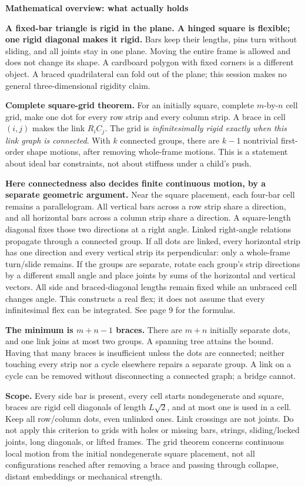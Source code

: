 \documentclass[letterpaper,11pt]{article}
\newcommand{\titleline}[1]{\par{\large\bfseries #1}\par}
\begin{document}
\titleline{Mathematical overview: what actually holds}
\textbf{A fixed-bar triangle is rigid in the plane. A hinged square is flexible; one rigid diagonal makes it rigid.} Bars keep their lengths, pins turn without sliding, and all joints stay in one plane. Moving the entire frame is allowed and does not change its shape. A cardboard polygon with fixed corners is a different object. A braced quadrilateral can fold out of the plane; this session makes no general three-dimensional rigidity claim.

\textbf{Complete square-grid theorem.} For an initially square, complete $m$-by-$n$ cell grid, make one dot for every row strip and every column strip. A brace in cell $(i,j)$ makes the link $R_iC_j$. The grid is \emph{infinitesimally rigid exactly when this link graph is connected}. With $k$ connected groups, there are $k-1$ nontrivial first-order shape motions, after removing whole-frame motions. This is a statement about ideal bar constraints, not about stiffness under a child's push.

\textbf{Here connectedness also decides finite continuous motion, by a separate geometric argument.} Near the square placement, each four-bar cell remains a parallelogram. All vertical bars across a row strip share a direction, and all horizontal bars across a column strip share a direction. A square-length diagonal fixes those two directions at a right angle. Linked right-angle relations propagate through a connected group. If all dots are linked, every horizontal strip has one direction and every vertical strip its perpendicular: only a whole-frame turn/slide remains. If the groups are separate, rotate each group's strip directions by a different small angle and place joints by sums of the horizontal and vertical vectors. All side and braced-diagonal lengths remain fixed while an unbraced cell changes angle. This constructs a real flex; it does not assume that every infinitesimal flex can be integrated. See page 9 for the formulas.

\textbf{The minimum is $m+n-1$ braces.} There are $m+n$ initially separate dots, and one link joins at most two groups. A spanning tree attains the bound. Having that many braces is insufficient unless the dots are connected; neither touching every strip nor a cycle elsewhere repairs a separate group. A link on a cycle can be removed without disconnecting a connected graph; a bridge cannot.

\textbf{Scope.} Every side bar is present, every cell starts nondegenerate and square, braces are rigid cell diagonals of length $L\sqrt2$, and at most one is used in a cell. Keep all row/column dots, even unlinked ones. Link crossings are not joints. Do not apply this criterion to grids with holes or missing bars, strings, sliding/locked joints, long diagonals, or lifted frames. The grid theorem concerns continuous local motion from the initial nondegenerate square placement, not all configurations reached after removing a brace and passing through collapse, distant embeddings or mechanical strength.
\end{document}
